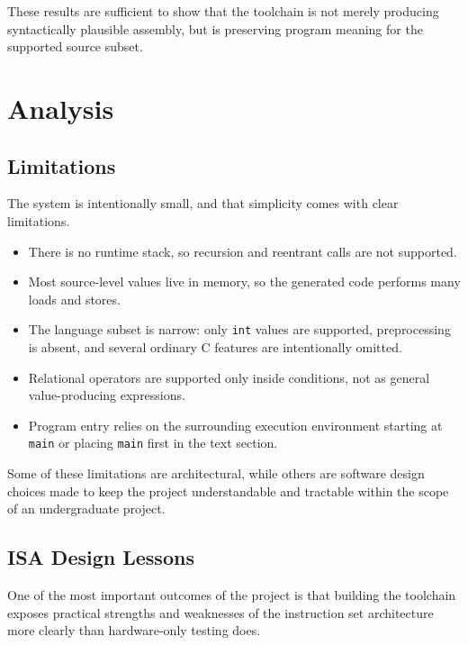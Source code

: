 \documentclass[12pt]{report}
\begin{document}
These results are sufficient to show that the toolchain is not merely producing
syntactically plausible assembly, but is preserving program meaning for the
supported source subset.

\chapter{Analysis}

\section{Limitations}

The system is intentionally small, and that simplicity comes with clear
limitations.

\begin{itemize}
    \item There is no runtime stack, so recursion and reentrant calls are not supported.
    \item Most source-level values live in memory, so the generated code performs many loads and stores.
    \item The language subset is narrow: only \texttt{int} values are supported, preprocessing is absent, and several ordinary C features are intentionally omitted.
    \item Relational operators are supported only inside conditions, not as general value-producing expressions.
    \item Program entry relies on the surrounding execution environment starting at \texttt{main} or placing \texttt{main} first in the text section.
\end{itemize}

Some of these limitations are architectural, while others are software design
choices made to keep the project understandable and tractable within the scope
of an undergraduate project.

\section{ISA Design Lessons}

One of the most important outcomes of the project is that building the
toolchain exposes practical strengths and weaknesses of the instruction set
architecture more clearly than hardware-only testing does.
\end{document}
